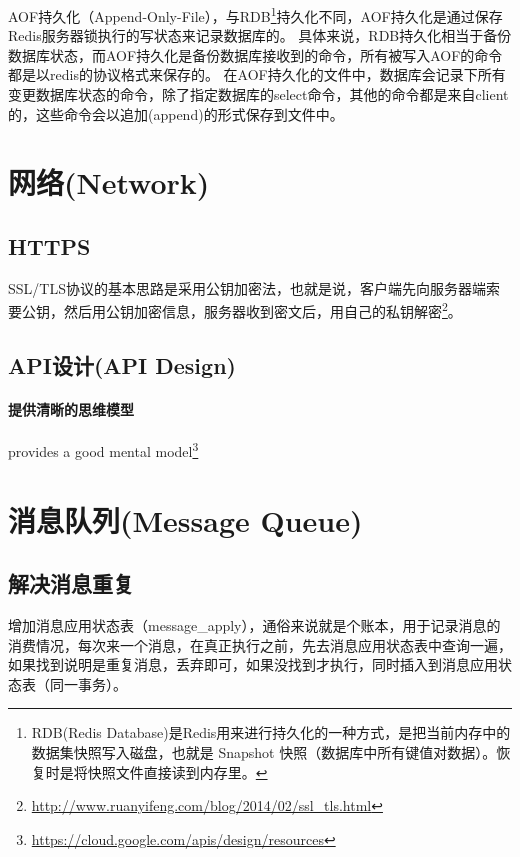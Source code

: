 \documentclass[../../../interview-questions.tex]{subfiles}
\begin{document}
AOF持久化（Append-Only-File），与RDB\footnote{RDB(Redis Database)是Redis用来进行持久化的一种方式，是把当前内存中的数据集快照写入磁盘，也就是 Snapshot 快照（数据库中所有键值对数据）。恢复时是将快照文件直接读到内存里。}持久化不同，AOF持久化是通过保存Redis服务器锁执行的写状态来记录数据库的。
具体来说，RDB持久化相当于备份数据库状态，而AOF持久化是备份数据库接收到的命令，所有被写入AOF的命令都是以redis的协议格式来保存的。
在AOF持久化的文件中，数据库会记录下所有变更数据库状态的命令，除了指定数据库的select命令，其他的命令都是来自client的，这些命令会以追加(append)的形式保存到文件中。

\section{网络(Network)}


\subsection{HTTPS}

SSL/TLS协议的基本思路是采用公钥加密法，也就是说，客户端先向服务器端索要公钥，然后用公钥加密信息，服务器收到密文后，用自己的私钥解密\footnote{\url{http://www.ruanyifeng.com/blog/2014/02/ssl_tls.html}}。

\subsection{API设计(API Design)}

\paragraph{提供清晰的思维模型}provides a good mental model\footnote{\url{https://cloud.google.com/apis/design/resources}}

\section{消息队列(Message Queue)}

\subsection{解决消息重复}

增加消息应用状态表（message\_apply），通俗来说就是个账本，用于记录消息的消费情况，每次来一个消息，在真正执行之前，先去消息应用状态表中查询一遍，如果找到说明是重复消息，丢弃即可，如果没找到才执行，同时插入到消息应用状态表（同一事务）。
\end{document}

